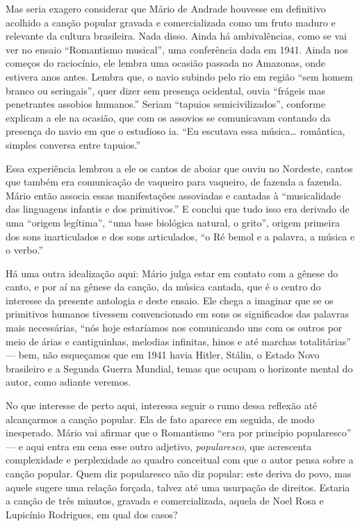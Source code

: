Mas seria exagero considerar que Mário de Andrade houvesse em definitivo
acolhido a canção popular gravada e comercializada como um fruto maduro
e relevante da cultura brasileira. Nada disso. Ainda há ambivalências,
como se vai ver no ensaio ``Romantismo musical'', uma conferência dada
em 1941. Ainda nos começos do raciocínio, ele lembra uma ocasião passada
no Amazonas, onde estivera anos antes. Lembra que, o navio subindo pelo
rio em região ``sem homem branco ou seringais'', quer dizer sem presença
ocidental, ouvia ``frágeis mas penetrantes assobios humanos.'' Seriam
``tapuios semicivilizados'', conforme explicam a ele na ocasião, que com
os assovios se comunicavam contando da presença do navio em que o
estudioso ia. ``Eu escutava essa música\ldots{} romântica, simples conversa
entre tapuios.''

Essa experiência lembrou a ele os cantos de aboiar que ouviu no
Nordeste, cantos que também era comunicação de vaqueiro para vaqueiro,
de fazenda a fazenda. Mário então associa essas manifestações assoviadas
e cantadas à ``musicalidade das linguagens infantis e dos primitivos.''
E conclui que tudo isso era derivado de uma ``origem legítima'', ``uma
base biológica natural, o grito'', origem primeira dos sons
inarticulados e dos sons articulados, ``o Ré bemol e a palavra, a música
e o verbo.''

Há uma outra idealização aqui: Mário julga estar em contato com a gênese
do canto, e por aí na gênese da canção, da música cantada, que é o
centro do interesse da presente antologia e deste ensaio. Ele chega a
imaginar que se os primitivos humanos tivessem convencionado em sons os
significados das palavras mais necessárias, ``nós hoje estaríamos nos
comunicando uns com os outros por meio de árias e cantiguinhas, melodias
infinitas, hinos e até marchas totalitárias'' --- bem, não esqueçamos que
em 1941 havia Hitler, Stálin, o Estado Novo brasileiro e a Segunda
Guerra Mundial, temas que ocupam o horizonte mental do autor, como
adiante veremos.

No que interesse de perto aqui, interessa seguir o rumo dessa reflexão
até alcançarmos a canção popular. Ela de fato aparece em seguida, de
modo inesperado. Mário vai afirmar que o Romantismo ``era por princípio
popularesco'' --- e aqui entra em cena esse outro adjetivo,
\textit{popularesco}, que acrescenta complexidade e perplexidade ao quadro
conceitual com que o autor pensa sobre a canção popular. Quem diz
popularesco não diz popular: este deriva do povo, mas aquele sugere uma
relação forçada, talvez até uma usurpação de direitos. Estaria a canção
de três minutos, gravada e comercializada, aquela de Noel Rosa e
Lupicínio Rodrigues, em qual dos casos?

